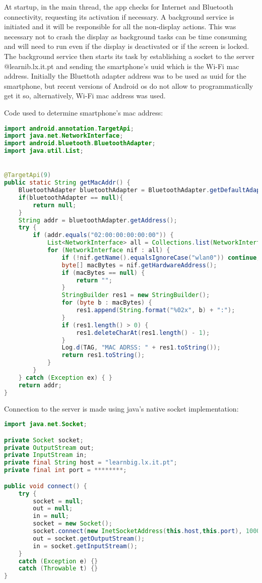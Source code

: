 At startup, in the main thread, the app checks for Internet and Bluetooth connectivity, requesting its activation if necessary. A background service is initiated and it will be responsible for all the non-display actions. This was necessary not to crash the display as background tasks can be time consuming and will need to run even if the display is deactivated or if the screen is locked.
The background service then starts its task by establishing a socket \cite{tcpip} to the server @learnib.lx.it.pt and sending the smartphone's \ac{uuid} which is the Wi-Fi mac address. Initially the Bluettoth adapter address was to be used as \ac{uuid} for the smartphone, but recent versions of Android \ac{os} do not allow to programmatically get it so, alternatively, Wi-Fi mac address was used. 

\FloatBarrier

Code used to determine smartphone's mac address:

\bigskip
\begin{lstlisting}[language=Java]
import android.annotation.TargetApi;
import java.net.NetworkInterface;
import android.bluetooth.BluetoothAdapter;
import java.util.List;


@TargetApi(9)
public static String getMacAddr() {
	BluetoothAdapter bluetoothAdapter = BluetoothAdapter.getDefaultAdapter();
	if(bluetoothAdapter == null){
		return null;
	}	
	String addr = bluetoothAdapter.getAddress();	
	try {
		if (addr.equals("02:00:00:00:00:00")) {		
			List<NetworkInterface> all = Collections.list(NetworkInterface.getNetworkInterfaces());
			for (NetworkInterface nif : all) {
				if (!nif.getName().equalsIgnoreCase("wlan0")) continue;			
				byte[] macBytes = nif.getHardwareAddress();
				if (macBytes == null) {
					return "";
				}
				StringBuilder res1 = new StringBuilder();
				for (byte b : macBytes) {
					res1.append(String.format("%02x", b) + ":");
				}				
				if (res1.length() > 0) {
					res1.deleteCharAt(res1.length() - 1);
				}
				Log.d(TAG, "MAC ADRSS: " + res1.toString());
				return res1.toString();
			}
		}
	} catch (Exception ex) { }
	return addr;
}
\end{lstlisting}
\bigskip

Connection to the server is made using java's native socket implementation:

\bigskip
\begin{lstlisting}[language=Java]
import java.net.Socket;

private Socket socket;
private OutputStream out;
private InputStream in;
private final String host = "learnbig.lx.it.pt";
private final int port = ********;

public void connect() {
	try {
		socket = null;
		out = null;
		in = null;
		socket = new Socket();		
		socket.connect(new InetSocketAddress(this.host,this.port), 10000);
		out = socket.getOutputStream();
		in = socket.getInputStream();
	}
	catch (Exception e) {}
	catch (Throwable t) {}
}
\end{lstlisting}
\bigskip

